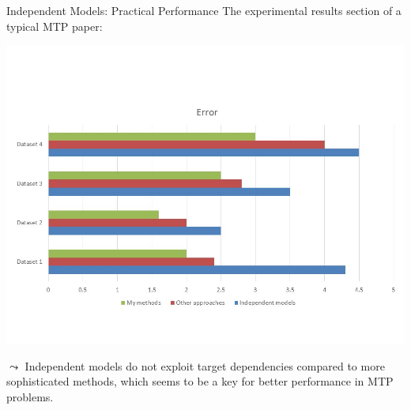 \begin{frame}{Independent Models: Practical Performance}
%	
	The experimental results section of a typical MTP paper: 
%	
	\begin{center}
		\includegraphics[scale=0.45, trim = 0 50 0 100,clip]{figure/barplots} \\
	\end{center}
%
	$\leadsto$ Independent models do not exploit target dependencies compared to more sophisticated methods, which seems to be a key for better performance in MTP problems.
%	
\end{frame}


